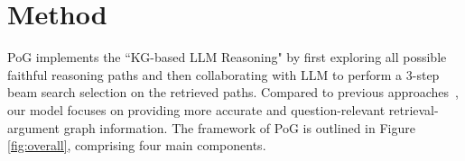 
\section{Method}
\label{sec:Method}





PoG implements the ``KG-based LLM Reasoning" by first exploring all possible faithful reasoning paths and then collaborating with LLM to perform a 3-step beam search selection on the retrieved paths. Compared to previous approaches~\cite{tog1.0sun2023think, tog2.0ma2024think}, our model focuses on providing more accurate and question-relevant retrieval-argument graph information. The framework of PoG is outlined in Figure \ref{fig:overall}, comprising four main components.



